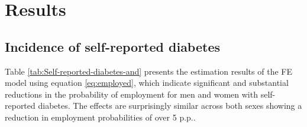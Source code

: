 \documentclass[12pt,english]{article}
\begin{document}
\section{\label{sec:RESULTS} Results}


\subsection{Incidence of self-reported diabetes}

Table \ref{tab:Self-reported-diabetes-and} presents the estimation
results of the \ac{FE} model using equation \ref{eq:employed}, which indicate significant and substantial reductions in the probability of employment for men and women with self-reported diabetes. The effects are surprisingly similar across both sexes showing a reduction in
employment probabilities of over 5 \ac{p.p.}. 
\end{document}
